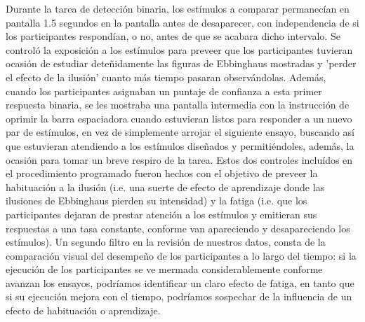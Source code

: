 Durante la tarea de detección binaria, los estímulos a comparar permanecían en pantalla 1.5 segundos en la pantalla antes de desaparecer, con independencia de si los participantes respondían, o no, antes de que se acabara dicho intervalo. Se controló la exposición a los estímulos para preveer que los participantes tuvieran ocasión de estudiar deteñidamente las figuras de Ebbinghaus mostradas y 'perder el efecto de la ilusión' cuanto más tiempo pasaran observándolas. Además, cuando los participantes asignaban un puntaje de confianza a esta primer respuesta binaria, se les mostraba una pantalla intermedia con la instrucción de oprimir la barra espaciadora cuando estuvieran listos para responder a un nuevo par de estímulos, en vez de simplemente arrojar el siguiente ensayo, buscando así que estuvieran atendiendo a los estímulos diseñados y permitiéndoles, además, la ocasión para tomar un breve respiro de la tarea. Estos dos controles incluídos en el procedimiento programado fueron hechos con el objetivo de preveer la habituación a la ilusión (i.e. una suerte de efecto de aprendizaje donde las ilusiones de Ebbinghaus pierden su intensidad) y la fatiga (i.e. que los participantes dejaran de prestar atención a los estímulos y emitieran sus respuestas a una tasa constante, conforme van apareciendo y desapareciendo los estímulos). Un segundo filtro en la revisión de nuestros datos, consta de la comparación visual del desempeño de los participantes a lo largo del tiempo: si la ejecución de los participantes se ve mermada considerablemente conforme avanzan los ensayos, podríamos identificar un claro efecto de fatiga, en tanto que si su ejecución mejora con el tiempo, podríamos sospechar de la influencia de un efecto de habituación o aprendizaje.



